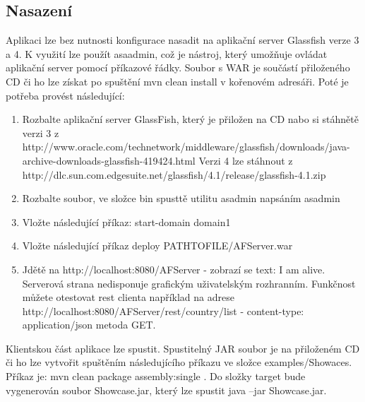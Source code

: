 \subsection{Nasazení}
Aplikaci lze bez nutnosti konfigurace nasadit na aplikační server Glassfish verze 3 a 4. K využití lze použít asaadmin, což je nástroj, který umožňuje ovládat aplikační server pomocí příkazové řádky. Soubor s WAR je součástí přiloženého CD či ho lze získat po spuštění mvn clean install v kořenovém adresáři. Poté je potřeba provést následující:
\begin{enumerate}
\item Rozbalte aplikační server GlassFish, který je přiložen na CD nabo si stáhnětě verzi 3 z http://www.oracle.com/technetwork/middleware/glassfish/downloads/java-archive-downloads-glassfish-419424.html Verzi 4 lze stáhnout z \\http://dlc.sun.com.edgesuite.net/glassfish/4.1/release/glassfish-4.1.zip
\item Rozbalte soubor, ve složce bin spusttě utilitu asadmin napsáním asadmin
\item Vložte následující příkaz: start-domain domain1
\item Vložte následující příkaz deploy PATHTOFILE/AFServer.war
\item Jdětě na http://localhost:8080/AFServer - zobrazí se text: I am alive. Serverová strana nedisponuje grafickým uživatelským rozhranním. Funkčnost můžete otestovat rest clienta například na adrese http://localhost:8080/AFServer/rest/country/list - content-type: application/json metoda GET.
\end{enumerate}
Klientskou část aplikace lze spustit. Spustitelný JAR soubor je na přiloženém CD či ho lze vytvořit spuštěním následujícího příkazu ve složce examples/Showaces. Příkaz je: mvn clean package assembly:single . Do složky target bude vygenerován soubor Showcase.jar, který lze spustit java –jar Showcase.jar. 
